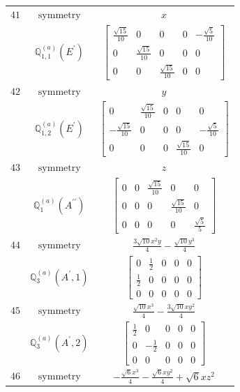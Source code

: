 \documentclass[fleqn,8pt,landscape]{jsarticle}
\begin{document}
\begin{longtable}{ccc}
$ 41 $ & $ \text{symmetry} $ & $ x $ \\
$  $ & $ \mathbb{Q}_{1,1}^{(a)}(E^{\prime}) $ & $ \begin{bmatrix} \frac{\sqrt{15}}{10} & 0 & 0 & 0 & - \frac{\sqrt{5}}{10} \\ 0 & \frac{\sqrt{15}}{10} & 0 & 0 & 0 \\ 0 & 0 & \frac{\sqrt{15}}{10} & 0 & 0 \end{bmatrix} $ \\ \hline
$ 42 $ & $ \text{symmetry} $ & $ y $ \\
$  $ & $ \mathbb{Q}_{1,2}^{(a)}(E^{\prime}) $ & $ \begin{bmatrix} 0 & \frac{\sqrt{15}}{10} & 0 & 0 & 0 \\ - \frac{\sqrt{15}}{10} & 0 & 0 & 0 & - \frac{\sqrt{5}}{10} \\ 0 & 0 & 0 & \frac{\sqrt{15}}{10} & 0 \end{bmatrix} $ \\ \hline
$ 43 $ & $ \text{symmetry} $ & $ z $ \\
$  $ & $ \mathbb{Q}_{1}^{(a)}(A^{\prime\prime}) $ & $ \begin{bmatrix} 0 & 0 & \frac{\sqrt{15}}{10} & 0 & 0 \\ 0 & 0 & 0 & \frac{\sqrt{15}}{10} & 0 \\ 0 & 0 & 0 & 0 & \frac{\sqrt{5}}{5} \end{bmatrix} $ \\ \hline
$ 44 $ & $ \text{symmetry} $ & $ \frac{3 \sqrt{10} x^{2} y}{4} - \frac{\sqrt{10} y^{3}}{4} $ \\
$  $ & $ \mathbb{Q}_{3}^{(a)}(A^{\prime},1) $ & $ \begin{bmatrix} 0 & \frac{1}{2} & 0 & 0 & 0 \\ \frac{1}{2} & 0 & 0 & 0 & 0 \\ 0 & 0 & 0 & 0 & 0 \end{bmatrix} $ \\ \hline
$ 45 $ & $ \text{symmetry} $ & $ \frac{\sqrt{10} x^{3}}{4} - \frac{3 \sqrt{10} x y^{2}}{4} $ \\
$  $ & $ \mathbb{Q}_{3}^{(a)}(A^{\prime},2) $ & $ \begin{bmatrix} \frac{1}{2} & 0 & 0 & 0 & 0 \\ 0 & - \frac{1}{2} & 0 & 0 & 0 \\ 0 & 0 & 0 & 0 & 0 \end{bmatrix} $ \\ \hline
$ 46 $ & $ \text{symmetry} $ & $ - \frac{\sqrt{6} x^{3}}{4} - \frac{\sqrt{6} x y^{2}}{4} + \sqrt{6} x z^{2} $ \\

\end{longtable}
\end{document}
